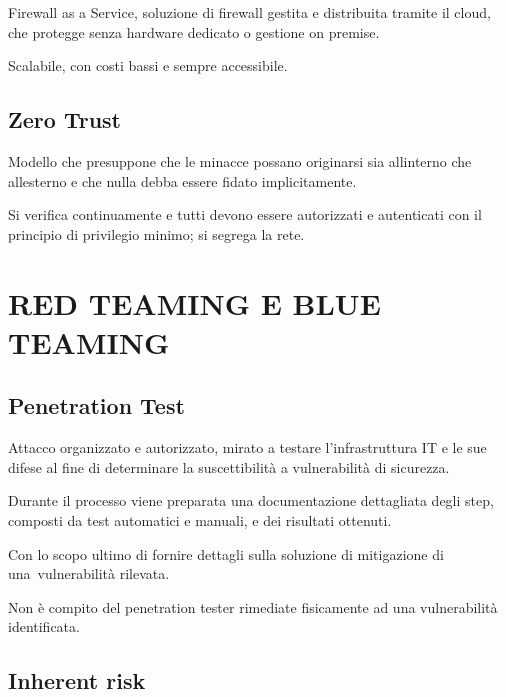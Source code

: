 \documentclass[
]{article}
\begin{document}
{Firewall as a Service, soluzione di firewall gestita e distribuita
tramite il cloud, che protegge senza hardware dedicato o gestione on
premise.}

{}

{Scalabile, con costi bassi e sempre accessibile.}

\subsection{\texorpdfstring{{Zero
Trust}}{Zero Trust}}\label{h.989bgm9wn7vv}

{Modello che presuppone che le minacce possano originarsi sia
all\textquotesingle interno che all\textquotesingle esterno e che nulla
debba essere fidato implicitamente.}

{}

{Si verifica continuamente e tutti devono essere autorizzati e
autenticati con il principio di privilegio minimo; si segrega la rete.}

\section{\texorpdfstring{{RED TEAMING E BLUE
TEAMING}}{RED TEAMING E BLUE TEAMING}}\label{h.ammtxc737ijv}

\subsection{\texorpdfstring{{Penetration
Test}}{Penetration Test}}\label{h.vkr8mumpa7on}

{Attacco }{organizzato e autorizzato, mirato a testare l'infrastruttura
IT e le sue difese al fine di determinare la suscettibilità a
vulnerabilità di sicurezza.}

{}

{Durante il processo viene preparata una documentazione dettagliata
degli step, composti da test automatici e manuali, e dei risultati
ottenuti.}

{Con lo scopo ultimo di fornire dettagli sulla soluzione di mitigazione
}{di una}{~vulnerabilità rilevata.}

{}

{Non è compito del penetration tester rimediate fisicamente ad una
vulnerabilità identificata.}

\subsection{\texorpdfstring{{Inherent
risk}}{Inherent risk}}\label{h.2xee6848vi5d}
\end{document}
